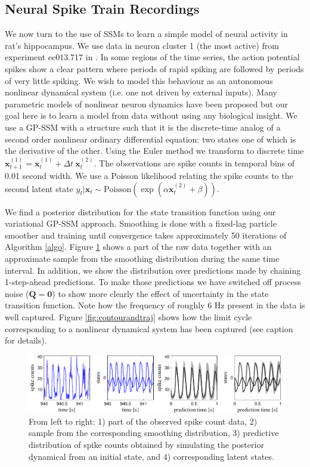 \documentclass{article} %
\newcommand{\n}[1]{\mathbf{#1}}
\newcommand{\x}{\mathbf{x}}
\begin{document}
\subsection{Neural Spike Train Recordings}

We now turn to the use of SSMs to learn a simple model of neural activity in rat's hippocampus. We use data in neuron cluster 1 (the most active) from experiment ec013.717 in \citep{Mizuseki2013}. In some regions of the time series, the action potential spikes show a clear pattern where periods of rapid spiking are followed by periods of very little spiking. We wish to model this behaviour as an autonomous nonlinear dynamical system (i.e. one not driven by external inputs). Many parametric models of nonlinear neuron dynamics have been proposed \citep{izhikevich2000neural} but our goal here is to learn a model from data without using any biological insight. We use a GP-SSM with a structure such that it is the discrete-time analog of a second order nonlinear ordinary differential equation: two states one of which is the derivative of the other. Using the Euler method we transform to discrete time $\x_{t+1}^{(1)} = \x_t^{(1)} + \Delta t \ \x_t^{(2)}$. The observations are spike counts in temporal bins of 0.01 second width. We use a Poisson likelihood relating the spike counts to the second latent state
$
	y_t | \x_t \sim \mathrm{Poisson}(\exp({\alpha} \x_t^{(2)} + \beta))
$. 

We find a posterior distribution for the state transition function using our variational GP-SSM approach. Smoothing is done with a fixed-lag particle smoother and training until convergence takes approximately 50 iterations of Algorithm \ref{algo}. Figure \ref{fig:bursting} shows a part of the raw data together with an approximate sample from the smoothing distribution during the same time interval. In addition, we show the distribution over predictions made by chaining 1-step-ahead predictions. To make those predictions we have switched off process noise ($\n{Q}=\n{0}$) to show more clearly the effect of uncertainty in the state transition function. Note how the frequency of roughly 6 Hz present in the data is well captured. Figure \ref{fig:contourandtraj} shows how the limit cycle corresponding to a nonlinear dynamical system has been captured (see caption for details).

\begin{figure}[tb]
\centering
\includegraphics[width=13cm]{bursting.pdf}
\vspace{-0.2cm}
\caption{From left to right: 1) part of the observed spike count data, 2) sample from the corresponding smoothing distribution, 3) predictive distribution of spike counts obtained by simulating the posterior dynamical from an initial state, and 4) corresponding latent states.}
\label{fig:bursting}
\end{figure}
\end{document}
